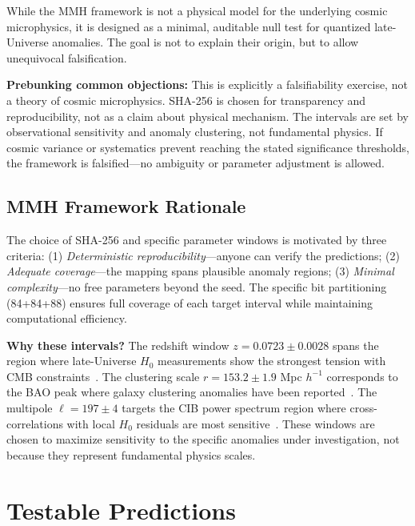 \documentclass[11pt,a4paper]{article}
\begin{document}
While the MMH framework is not a physical model for the underlying cosmic microphysics, it is designed as a minimal, auditable null test for quantized late-Universe anomalies. The goal is not to explain their origin, but to allow unequivocal falsification.

\textbf{Prebunking common objections:} This is explicitly a falsifiability exercise, not a theory of cosmic microphysics. SHA-256 is chosen for transparency and reproducibility, not as a claim about physical mechanism. The intervals are set by observational sensitivity and anomaly clustering, not fundamental physics. If cosmic variance or systematics prevent reaching the stated significance thresholds, the framework is falsified---no ambiguity or parameter adjustment is allowed.

\subsection{MMH Framework Rationale}
The choice of SHA-256 and specific parameter windows is motivated by three criteria: (1) \textit{Deterministic reproducibility}---anyone can verify the predictions; (2) \textit{Adequate coverage}---the mapping spans plausible anomaly regions; (3) \textit{Minimal complexity}---no free parameters beyond the seed. The specific bit partitioning (84+84+88) ensures full coverage of each target interval while maintaining computational efficiency.

\textbf{Why these intervals?} The redshift window $z = 0.0723 \pm 0.0028$ spans the region where late-Universe $H_0$ measurements show the strongest tension with CMB constraints~\cite{Riess2024}. The clustering scale $r = 153.2 \pm 1.9$ Mpc $h^{-1}$ corresponds to the BAO peak where galaxy clustering anomalies have been reported~\cite{DESI2025}. The multipole $\ell = 197 \pm 4$ targets the CIB power spectrum region where cross-correlations with local $H_0$ residuals are most sensitive~\cite{TRGB2025}. These windows are chosen to maximize sensitivity to the specific anomalies under investigation, not because they represent fundamental physics scales.

\FloatBarrier
\section{Testable Predictions}
\end{document}
